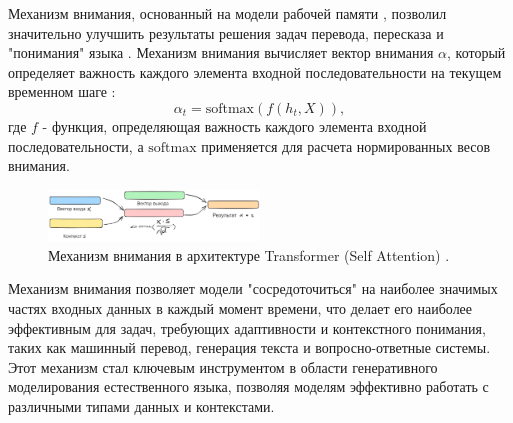 Механизм внимания, основанный на модели рабочей памяти \cite{wallace1960plans}, позволил значительно улучшить результаты
решения задач перевода, пересказа и "понимания" языка \cite{bahdanau2014neural}.
Механизм внимания вычисляет вектор внимания \( \alpha \), который определяет важность каждого элемента входной 
последовательности на текущем временном шаге \cite{bahdanau2014neural}:
\begin{equation}
    \alpha_t = \text{softmax}(f(h_t, X)),
\end{equation}
где \( f \) - функция, определяющая важность каждого элемента входной последовательности, 
а \( \text{softmax} \) применяется для расчета нормированных весов внимания.

\begin{figure}[h]
    \centering
    \includegraphics[width=0.5\textwidth]{assets/ml/nn/attention.excalidraw.png}
    \caption{Механизм внимания в архитектуре Transformer (Self Attention) \cite{vaswani2017attention}. }
    \label{self_attention}
\end{figure}

Механизм внимания позволяет модели "сосредоточиться" на наиболее значимых частях входных данных в каждый момент времени, 
что делает его наиболее эффективным для задач, требующих адаптивности и контекстного понимания, таких как машинный перевод, 
генерация текста и вопросно-ответные системы. Этот механизм стал ключевым инструментом в области генеративного 
моделирования естественного языка, позволяя моделям эффективно работать с различными типами данных и контекстами.

